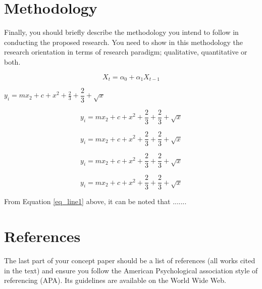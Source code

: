 \documentclass[twoside,a4paper,12pt]{article}
\begin{document}
\section*{Methodology} Finally, you should briefly describe the methodology you intend to follow in conducting the proposed research. You need to show in this methodology the research orientation in terms of research paradigm; qualitative, quantitative or both.

\begin{equation}
X_t=\alpha_0+\alpha_1 X_{t-1}
\end{equation}

\begin{center}
	$ y_{i}=mx_{2} +c +x^{2} +\frac{2}{3}+\dfrac{2}{3}+\sqrt{x}$
\end{center}

\begin{equation}
\label{eq_line}
y_{i}=mx_{2} +c +x^{2} +\frac{2}{3}+\dfrac{2}{3}+\sqrt{x}
\end{equation}

\begin{equation}
\label{eq_line1}
y_{i}=mx_{2} +c +x^{2} +\frac{2}{3}+\dfrac{2}{3}+\sqrt{x}
\end{equation}

\begin{equation}
\label{eq_line2}
 y_{i}=mx_{2} +c +x^{2} +\frac{2}{3}+\dfrac{2}{3}+\sqrt{x}
\end{equation}

\begin{equation*}
 y_{i}=mx_{2} +c +x^{2} +\frac{2}{3}+\dfrac{2}{3}+\sqrt{x}
\end{equation*}

From Equation \ref{eq_line1} above, it can be noted that .......

\section*{References} The last part of your concept paper should be a list of references (all works cited in the text) and ensure you follow the American Psychological association style of referencing (APA). Its guidelines are available on the World Wide Web. 
\end{document}
